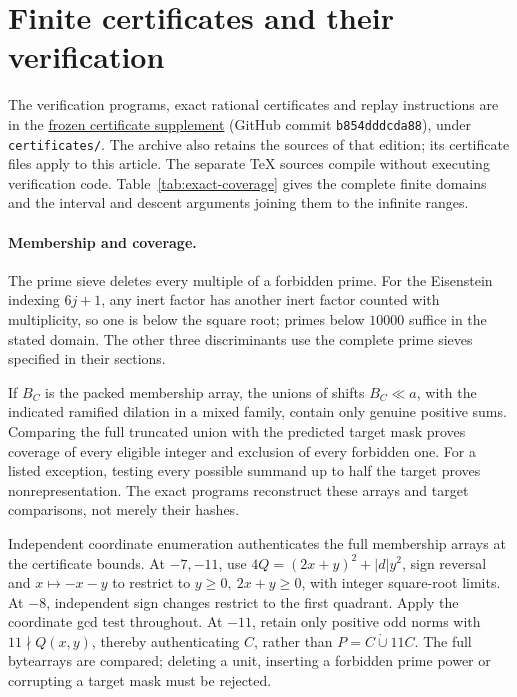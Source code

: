 \section{Finite certificates and their verification}\label{app:verifier}

The verification programs, exact rational certificates and replay
instructions are in the
\href{https://raw.githubusercontent.com/royvanrijn/jacobian-research/b854dddcda88fd9c733d18e14a8ff5ae4a0b25b8/unpublished/eisenstein-restricted-prime-sums/source.zip}{frozen certificate supplement}
(GitHub commit \texttt{b854dddcda88}), under \texttt{certificates/}.
The archive also retains the sources of that edition; its certificate
files apply to this article. The separate TeX sources compile without
executing verification code. Table~\ref{tab:exact-coverage} gives the
complete finite domains and the interval and descent arguments joining
them to the infinite ranges.

\paragraph{Membership and coverage.}
The prime sieve deletes every multiple of a forbidden prime.
For the Eisenstein indexing \(6j+1\), any inert factor has another
inert factor counted with multiplicity, so one is below the square
root; primes below \(10000\) suffice in the stated domain.
The other three discriminants use the complete prime sieves specified
in their sections.

If \(B_C\) is the packed membership array, the unions of shifts
\(B_C\ll a\), with the indicated ramified dilation in a mixed family,
contain only genuine positive sums. Comparing the full truncated union
with the predicted target mask proves coverage of every eligible
integer and exclusion of every forbidden one. For a listed exception,
testing every possible summand up to half the target proves
nonrepresentation. The exact programs reconstruct these arrays and
target comparisons, not merely their hashes.

Independent coordinate enumeration authenticates the full membership
arrays at the certificate bounds. At \(-7,-11\), use
\(4Q=(2x+y)^2+|d|y^2\), sign reversal and \(x\mapsto-x-y\)
to restrict to \(y\ge0,\ 2x+y\ge0\), with integer square-root limits.
At \(-8\), independent sign changes restrict to the first quadrant.
Apply the coordinate gcd test throughout. At \(-11\), retain only
positive odd norms with \(11\nmid Q(x,y)\), thereby authenticating
\(C\), rather than \(P=C\mathbin{\dot\cup}11C\).
The full bytearrays are compared; deleting a unit, inserting a
forbidden prime power or corrupting a target mask must be rejected.

